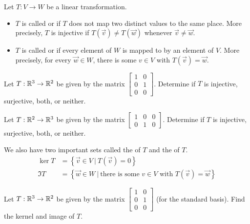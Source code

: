 
\begin{applicationActivities}{2}{18}

\begin{definition}
Let $T: V \rightarrow W$ be a linear transformation.
\begin{itemize}
\item $T$ is called  or  if $T$ does not map two distinct values to the same place.  More precisely, $T$ is injective if $T(\vec{v}) \neq T(\vec{w})$ whenever $\vec{v} \neq \vec{w}$.
\item $T$ is called  or  if every element of $W$ is mapped to by an element of $V$.  More precisely, for every $\vec{w} \in W$, there is some $v \in V$ with $T(\vec{v})=\vec{w}$.
\end{itemize}
\end{definition}

\begin{activity}{0}
Let $T: \mathbb{R}^3 \rightarrow \mathbb{R}^2$ be given by the matrix $\begin{bmatrix} 1 & 0 \\ 0 & 1 \\ 0 & 0 \end{bmatrix}$.  Determine if $T$ is injective, surjective, both, or neither.
\end{activity}

\begin{activity}{0}
Let $T: \mathbb{R}^2 \rightarrow \mathbb{R}^3$ be given by the matrix $\begin{bmatrix} 1 & 0 &0  \\ 0 & 1 & 0 \end{bmatrix}$.  Determine if $T$ is injective, surjective, both, or neither.
\end{activity}

\begin{definition}
We also have two important sets called the  of $T$ and the  of $T$.
\begin{align*}
\ker T &= \left\{ \vec{v} \in V\ \big|\ T(\vec{v})=0\right\} \\
\Im T &= \left\{ \vec{w} \in W\ \big|\ \text{there is some }v\in V \text{ with } T(\vec{v})=\vec{w}\right\}
\end{align*}
\end{definition}

\begin{activity}{0}
Let $T: \mathbb{R}^3 \rightarrow \mathbb{R}^2$ be given by the matrix $\begin{bmatrix} 1 & 0 \\ 0 & 1 \\ 0 & 0 \end{bmatrix}$ (for the standard basis).  Find the kernel and image of $T$.
\end{activity}


\end{applicationActivities}
